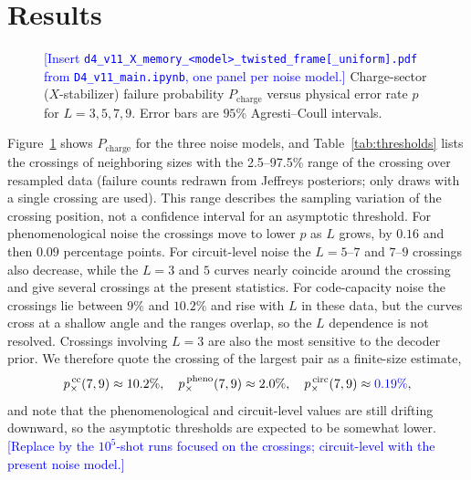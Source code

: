 \documentclass[a4paper]{article}
\newcommand{\blue}[1]{\textcolor{blue}{#1}}
\begin{document}
\section{Results}
\label{sec:results}

\begin{figure}[t]
  \centering
  \fbox{\rule{0pt}{50mm}\rule{0.82\linewidth}{0pt}}
  \caption{\blue{[Insert \texttt{d4\_v11\_X\_memory\_<model>\_twisted\_frame[\_uniform].pdf} from \texttt{D4\_v11\_main.ipynb}, one panel per noise model.]} Charge-sector ($X$-stabilizer) failure probability $P_{\mathrm{charge}}$ versus physical error rate $p$ for $L=3,5,7,9$. Error bars are $95\%$ Agresti--Coull intervals.}
  \label{fig:threshold}
\end{figure}

Figure~\ref{fig:threshold} shows $P_{\mathrm{charge}}$ for the three noise models, and Table~\ref{tab:thresholds} lists the crossings of neighboring sizes with the 2.5--97.5\% range of the crossing over resampled data (failure counts redrawn from Jeffreys posteriors; only draws with a single crossing are used). This range describes the sampling variation of the crossing position, not a confidence interval for an asymptotic threshold. For phenomenological noise the crossings move to lower $p$ as $L$ grows, by $0.16$ and then $0.09$ percentage points. For circuit-level noise the $L=5$--$7$ and $7$--$9$ crossings also decrease, while the $L=3$ and $5$ curves nearly coincide around the crossing and give several crossings at the present statistics. For code-capacity noise the crossings lie between $9\%$ and $10.2\%$ and rise with $L$ in these data, but the curves cross at a shallow angle and the ranges overlap, so the $L$ dependence is not resolved. Crossings involving $L=3$ are also the most sensitive to the decoder prior. We therefore quote the crossing of the largest pair as a finite-size estimate,
\begin{equation}
  p_\times^{\,\mathrm{cc}}(7,9)\approx10.2\%,\quad
  p_\times^{\,\mathrm{pheno}}(7,9)\approx2.0\%,\quad
  p_\times^{\,\mathrm{circ}}(7,9)\approx\blue{0.19\%},
\end{equation}
and note that the phenomenological and circuit-level values are still drifting downward, so the asymptotic thresholds are expected to be somewhat lower. \blue{[Replace by the $10^5$-shot runs focused on the crossings; circuit-level with the present noise model.]}
\end{document}
